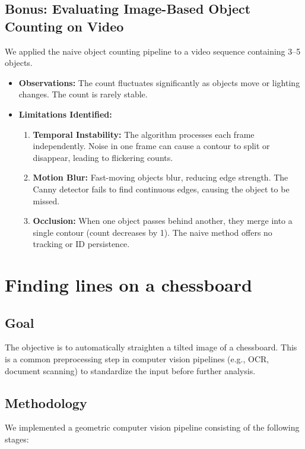 \documentclass[12pt]{article}
\begin{document}
\subsection{Bonus: Evaluating Image-Based Object Counting on Video}
We applied the naive object counting pipeline to a video sequence containing 3--5 objects.
\begin{itemize}
    \item \textbf{Observations:} The count fluctuates significantly as objects move or lighting changes. The count is rarely stable.
    \item \textbf{Limitations Identified:}
    \begin{enumerate}
        \item \textbf{Temporal Instability:} The algorithm processes each frame independently. Noise in one frame can cause a contour to split or disappear, leading to flickering counts.
        \item \textbf{Motion Blur:} Fast-moving objects blur, reducing edge strength. The Canny detector fails to find continuous edges, causing the object to be missed.
        \item \textbf{Occlusion:} When one object passes behind another, they merge into a single contour (count decreases by 1). The naive method offers no tracking or ID persistence.
    \end{enumerate}
\end{itemize}

\newpage
\section{Finding lines on a chessboard}

\subsection{Goal}
The objective is to automatically straighten a tilted image of a chessboard. This is a common preprocessing step in computer vision pipelines (e.g., OCR, document scanning) to standardize the input before further analysis.

\subsection{Methodology}
We implemented a geometric computer vision pipeline consisting of the following stages:
\end{document}
